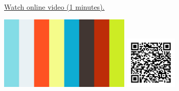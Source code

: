 
\begin{minipage}{10cm}
    \href{https://act4e-spring21.netlify.app/videos/spring2021-operads-a:operad-multilin-maps.html}{Watch online video (1 minutes).}
        
    \href{https://act4e-spring21.netlify.app/videos/spring2021-operads-a:operad-multilin-maps.html}{\includegraphics[height=3.5cm]{spring2021-operads-a:operad-multilin-maps/thumbnails.jpg}}
    \href{https://act4e-spring21.netlify.app/videos/spring2021-operads-a:operad-multilin-maps.html}{\includegraphics[height=2.5cm]{spring2021-operads-a:operad-multilin-maps/qrcode.png}}
\end{minipage}
